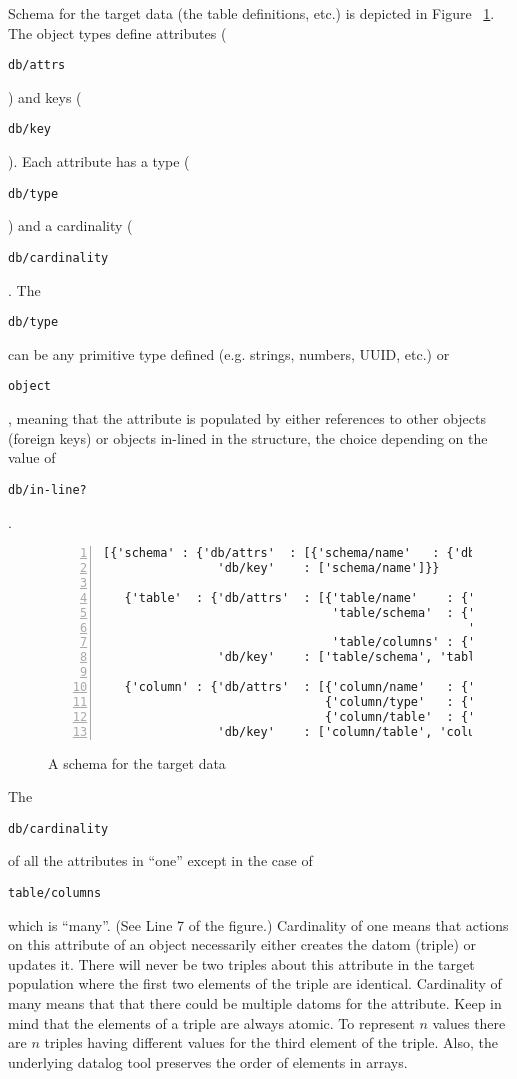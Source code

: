 \documentclass[9pt,letterpaper]{article}
\newcommand{\stt}[1]{\begin{footnotesize}\texttt{#1}\end{footnotesize}}
\begin{document}
Schema for the target data (the table definitions, etc.) is depicted in Figure ~\ref{code:example-schema-1}.
The object types define attributes (\stt{db/attrs}) and keys (\stt{db/key}).
Each attribute has a type (\stt{db/type}) and a cardinality (\stt{db/cardinality}.
The \stt{db/type} can be any primitive type defined (e.g. strings, numbers, UUID, etc.) or \stt{object}, meaning that
the attribute is populated by either references to other objects (foreign keys) or objects in-lined in the structure, the choice depending on the value of \stt{db/in-line?}.

\begin{figure}[H]
  \caption{A schema for the target data}
  \label{code:example-schema-1}
\begin{lstlisting}[numberstyle=\scriptsize,basicstyle=\ttfamily\scriptsize,numbers=left,stepnumber=1,breaklines=true]
  [{'schema' : {'db/attrs'  : [{'schema/name'   : {'db/type' : 'string', 'db/cardinality' : 'one'}}],
                'db/key'    : ['schema/name']}}

   {'table'  : {'db/attrs'  : [{'table/name'    : {'db/type' : 'string', 'db/cardinality' : 'one' },
                                'table/schema'  : {'db/type' : 'object', 'db/cardinality' : 'one',
                                                   'db/in-line?' : true},
                                'table/columns' : {'db/type' : 'object', 'db/cardinality' : 'many'}}],
                'db/key'    : ['table/schema', 'table/name']}}

   {'column' : {'db/attrs'  : [{'column/name'   : {'db/type' : 'string', 'db/cardinality' : 'one'}},
                               {'column/type'   : {'db/type' : 'string', 'db/cardinality' : 'one'}},
                               {'column/table'  : {'db/type' : 'object', 'db/cardinality' : 'one'}}],
                'db/key'    : ['column/table', 'column/name']}}]
\end{lstlisting}
\end{figure}

The \stt{db/cardinality} of all the attributes in ``one'' except in the case of \stt{table/columns} which is ``many''.
(See Line 7 of the figure.)
Cardinality of one means that actions on this attribute of an object necessarily either creates the datom (triple) or updates it.
There will never be two triples about this attribute in the target population where the first two elements of the triple are identical.
Cardinality of many means that that there could be multiple datoms for the attribute.
Keep in mind that the elements of a triple are always atomic.
To represent $n$ values there are $n$ triples having different values for the third element of the triple.
Also, the underlying datalog tool preserves the order of elements in arrays.
\end{document}
